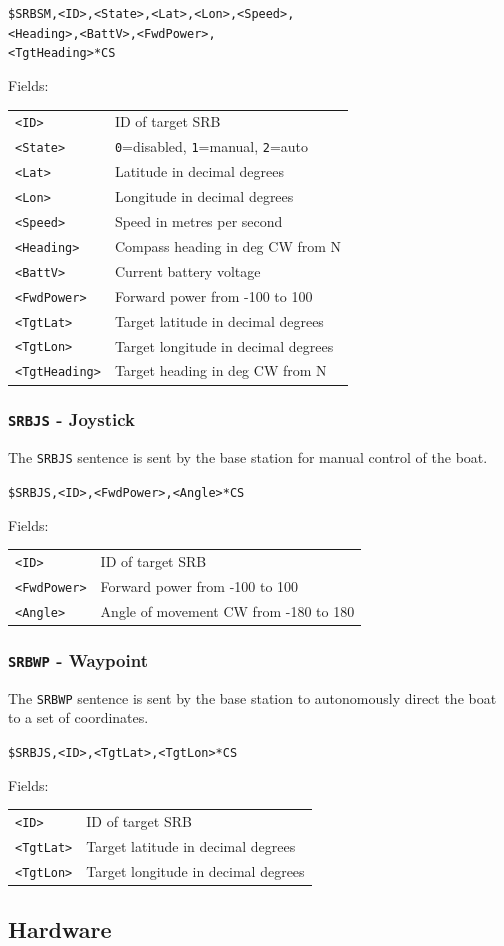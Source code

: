 \documentclass[a4paper]{IEEEtran}
\newenvironment{nmeaspec}[1]
{
\newcommand{\field}[2]{\texttt{##1} & ##2 \\}
\vspace{0.2cm}
\noindent\texttt{#1}
\vspace{0.2cm}

\noindent Fields:
\vspace{0.1cm} \\ 
\noindent \vspace{0.2cm}
\begin{tabular}{ll}
}
{
\end{tabular}
}
\begin{document}
\begin{nmeaspec}{\$SRBSM,<ID>,<State>,<Lat>,<Lon>,<Speed>,\\<Heading>,<BattV>,<FwdPower>,\\<TgtHeading>*CS}
\field{<ID>}{ID of target SRB}
\field{<State>}{\texttt{0}=disabled, \texttt{1}=manual, \texttt{2}=auto}
\field{<Lat>}{Latitude in decimal degrees}
\field{<Lon>}{Longitude in decimal degrees}
\field{<Speed>}{Speed in metres per second}
\field{<Heading>}{Compass heading in deg CW from N}
\field{<BattV>}{Current battery voltage}
\field{<FwdPower>}{Forward power from -100 to 100}
\field{<TgtLat>}{Target latitude in decimal degrees}
\field{<TgtLon>}{Target longitude in decimal degrees}
\field{<TgtHeading>}{Target heading in deg CW from N}
\end{nmeaspec}

\subsubsection{\texttt{SRBJS} - Joystick}
The \texttt{SRBJS} sentence is sent by the base station for manual control of the boat.

\begin{nmeaspec}{\$SRBJS,<ID>,<FwdPower>,<Angle>*CS}
\field{<ID>}{ID of target SRB}
\field{<FwdPower>}{Forward power from -100 to 100}
\field{<Angle>}{Angle of movement CW from -180 to 180}
\end{nmeaspec}

\subsubsection{\texttt{SRBWP} - Waypoint}
The \texttt{SRBWP} sentence is sent by the base station to autonomously direct the boat to a set of coordinates.

\begin{nmeaspec}{\$SRBJS,<ID>,<TgtLat>,<TgtLon>*CS}
\field{<ID>}{ID of target SRB}
\field{<TgtLat>}{Target latitude in decimal degrees}
\field{<TgtLon>}{Target longitude in decimal degrees}
\end{nmeaspec}

\subsection{Hardware}
\end{document}
